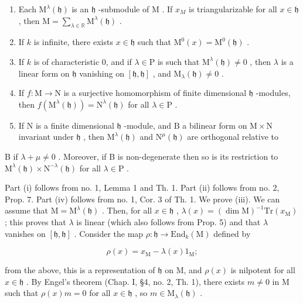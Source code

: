 \begin{enumerate}
\def\labelenumi{(\roman{enumi})}
\item
  Each \(\mathrm{M}^{\lambda}(\mathfrak{h})\) is an \(\mathfrak{h}\) -submodule of \(\mathrm{M}\) . If \(x_{M}\) is triangularizable for all \(x\in \mathfrak{h}\) , then \(\mathrm{M} = \sum_{\lambda \in \mathbb{R}}\mathrm{M}^{\lambda}(\mathfrak{h})\) .
\item
  If \(k\) is infinite, there exists \(x \in \mathfrak{h}\) such that \(\mathrm{M}^0(x) = \mathrm{M}^0(\mathfrak{h})\) .
\item
  If \(k\) is of characteristic 0, and if \(\lambda \in \mathrm{P}\) is such that \(\mathrm{M}^{\lambda}(\mathfrak{h}) \neq 0\) , then \(\lambda\) is a linear form on \(\mathfrak{h}\) vanishing on \([\mathfrak{h},\mathfrak{h}]\) , and \(\mathrm{M}_{\lambda}(\mathfrak{h}) \neq 0\) .
\item
  If \(f: \mathrm{M} \to \mathrm{N}\) is a surjective homomorphism of finite dimensional \(\mathfrak{h}\) -modules, then \(f(\mathrm{M}^{\lambda}(\mathfrak{h})) = \mathrm{N}^{\lambda}(\mathfrak{h})\) for all \(\lambda \in \mathrm{P}\) .
\item
  If \(\mathrm{N}\) is a finite dimensional \(\mathfrak{h}\) -module, and \(\mathrm{B}\) a bilinear form on \(\mathrm{M} \times \mathrm{N}\) invariant under \(\mathfrak{h}\) , then \(\mathrm{M}^{\lambda}(\mathfrak{h})\) and \(\mathrm{N}^{\mu}(\mathfrak{h})\) are orthogonal relative to
\end{enumerate}

B if \(\lambda + \mu \neq 0\) . Moreover, if B is non-degenerate then so is its restriction to \(\mathrm{M}^{\lambda}(\mathfrak{h}) \times \mathrm{N}^{-\lambda}(\mathfrak{h})\) for all \(\lambda \in \mathrm{P}\) .

Part (i) follows from no. 1, Lemma 1 and Th. 1. Part (ii) follows from no. 2, Prop. 7. Part (iv) follows from no. 1, Cor. 3 of Th. 1. We prove (iii). We can assume that \(\mathrm{M} = \mathrm{M}^{\lambda}(\mathfrak{h})\) . Then, for all \(x \in \mathfrak{h}\) , \(\lambda(x) = (\dim \mathrm{M})^{-1}\mathrm{Tr}(x_{\mathrm{M}})\) ; this proves that \(\lambda\) is linear (which also follows from Prop. 5) and that \(\lambda\) vanishes on \([\mathfrak{h},\mathfrak{h}]\) . Consider the map \(\rho : \mathfrak{h} \to \mathrm{End}_k(\mathrm{M})\) defined by

\[
\rho (x) = x _ {\mathrm{M}} - \lambda (x) 1 _ {\mathrm{M}};
\]

from the above, this is a representation of \(\mathfrak{h}\) on M, and \(\rho(x)\) is nilpotent for all \(x \in \mathfrak{h}\) . By Engel's theorem (Chap. I, §4, no. 2, Th. 1), there exists \(m \neq 0\) in M such that \(\rho(x)m = 0\) for all \(x \in \mathfrak{h}\) , so \(m \in \mathrm{M}_{\lambda}(\mathfrak{h})\) .

